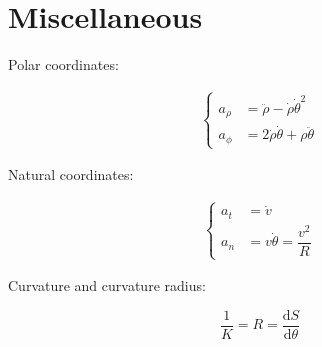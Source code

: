 \documentclass[10pt, a4paper]{article}
\def\d{\mathrm{d}}
\begin{document}
\section{Miscellaneous}

\begin{multicols}{2}
	
	Polar coordinates:
	
	\begin{align}
	\left\{
		\begin{aligned}
			a_\rho &= \ddot{\rho} - \dot{\rho}\dot{\theta}^2\\
			a_\phi &= 2\dot{\rho}\dot{\theta} +\rho\ddot{\theta}
		\end{aligned}
	\right.
	\end{align}
	
	Natural coordinates:
	
	\begin{align}
	\left\{
		\begin{aligned}
			a_t &= \dot{v}\\
			a_n &= v\dot{\theta} = \dfrac{v^2}{R}
		\end{aligned}
	\right.
	\end{align}
	
	Curvature and curvature radius:
	
	$$ \dfrac{1}{K} = R = \dfrac{\d S}{\d \theta}$$
	
\end{multicols}
\end{document}
